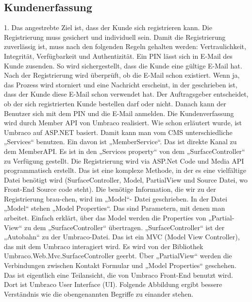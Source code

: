 \subsection{Kundenerfassung}
1. Das angestrebte Ziel ist, dass der Kunde sich registrieren kann. Die Registrierung muss gesichert und individuell sein. Damit die Registrierung zuverlässig ist, muss nach den folgenden Regeln gehalten werden: Vertraulichkeit, Integrität, Verfügbarkeit und Authentizität.
Ein \ac{PIN} lässt sich in E-Mail des Kunde zusenden. So wird sichergestellt, dass die Kunde eine gültige E-Mail hat. Nach der Registrierung wird überprüft, ob die E-Mail schon existiert. Wenn ja, das Prozess wird storniert und eine Nachricht erscheint, in der geschrieben ist, dass der Kunde diese E-Mail schon verwendet hat. 
Der Auftragsgeber entscheidet, ob der sich registrierten Kunde bestellen darf    oder nicht. Danach kann der Benutzer sich mit dem PIN und die E-Mail anmelden. 
Die Kundenverfassung wird durch Member \ac{API} von Umbraco realisiert. 
Wie schon erläutert wurde, ist Umbraco auf ASP.NET basiert. Damit kann man vom CMS unterschiedliche „Services“ benutzen. Ein davon ist „MemberService“. Das ist direkte Kanal zu dem MemberAPI. Es ist in den „Services property“ von dem „SurfaceController“ zu Verfügung gestellt. 
Die Registrierung wird via ASP.Net Code und Media API programmatisch erstellt. Das ist eine komplexe Methode, in der es eine vielfältige Datei benötigt wird (SurfaceController, Model, PartialView und Source Datei, wo Front-End Source code steht). Die benötige Information, die wir zu der Registrierung brau-chen, wird im „Model“- Datei geschrieben. 
In der Datei „Model“ stehen „Model Properties“. Das sind Parametern, mit denen man arbeitet. Einfach erklärt, über das Model werden die Properties von „Partial-View“ zu dem „SurfaceController“ übertragen.
„SurfaceController“ ist der „Autobahn“ zu der Umbraco-Datei. Das ist ein MVC (Model View Controller), das mit dem Umbraco interagiert wird. Es wird von der Bibliothek Umbraco.Web.Mvc.SurfaceController geerbt. 
Über „PartialView“ werden die Verbindungen zwischen Kontakt Formular und „Model Properties“ geschehen. Das ist eigentlich eine Teilansicht, die von Umbraco Front-End benutzt wird. Dort ist Umbraco User Interface (UI). 
Folgende Abbildung ergibt bessere Verständnis wie die obengenannten Begriffe zu einander stehen.




